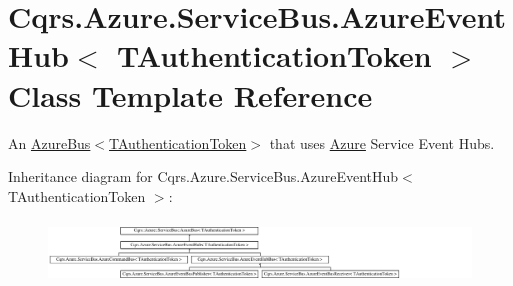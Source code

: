 \hypertarget{classCqrs_1_1Azure_1_1ServiceBus_1_1AzureEventHub}{}\section{Cqrs.\+Azure.\+Service\+Bus.\+Azure\+Event\+Hub$<$ T\+Authentication\+Token $>$ Class Template Reference}
\label{classCqrs_1_1Azure_1_1ServiceBus_1_1AzureEventHub}


An \hyperlink{classCqrs_1_1Azure_1_1ServiceBus_1_1AzureBus_a1046ff74282fd178f43e28420433d2a9_a1046ff74282fd178f43e28420433d2a9}{Azure\+Bus$<$\+T\+Authentication\+Token$>$} that uses \hyperlink{namespaceCqrs_1_1Azure}{Azure} Service Event Hubs.  


Inheritance diagram for Cqrs.\+Azure.\+Service\+Bus.\+Azure\+Event\+Hub$<$ T\+Authentication\+Token $>$\+:\begin{figure}[H]
\begin{center}
\leavevmode
\includegraphics[height=1.689291cm]{classCqrs_1_1Azure_1_1ServiceBus_1_1AzureEventHub}
\end{center}
\end{figure}
